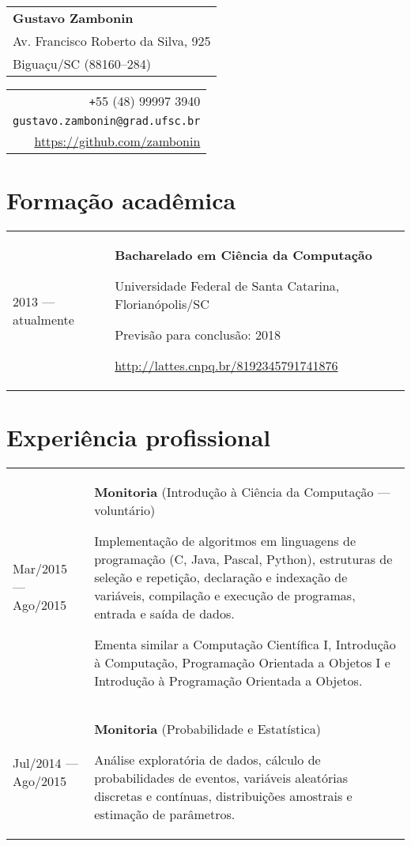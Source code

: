 \documentclass{article}
\newenvironment{contenttable}[1]
  {\section*{#1}
   \newcolumntype{L}{>{\bf \raggedleft}p{0.13\textwidth}}
   \newcolumntype{R}{p{0.82\textwidth}}
   \begin{tabular}{L!{\color{lightgray} \vrule}R}}
  {\end{tabular}}
\newenvironment{smallitem}
  {\vspace{-2mm}\itemize%
   \setlength{\parskip}{0pt}
   \setlength{\itemsep}{2pt}}
  {\vspace{-2mm}\enditemize}
\begin{document}
\begin{tabular}{@{\hspace{-5mm}}l}
  {\Large \textbf{Gustavo Zambonin}}    \\
  Av. Francisco Roberto da Silva, 925   \\
  Biguaçu/SC (88160--284)
\end{tabular}
\hfill
\begin{tabular}{r}
  \verb!+!55 (48) 99997 3940            \\
  \verb!gustavo.zambonin@grad.ufsc.br!  \\
  \url{https://github.com/zambonin}
\end{tabular}

\begin{contenttable}{Formação acadêmica}
  2013 --- atualmente & \textbf{Bacharelado em Ciência da Computação}
  \begin{smallitem}
    \item Universidade Federal de Santa Catarina, Florianópolis/SC
    \item Previsão para conclusão: 2018
    \item \url{http://lattes.cnpq.br/8192345791741876}
  \end{smallitem}
\end{contenttable}

\begin{contenttable}{Experiência profissional}
  Mar/2015 --- Ago/2015 & \textbf{Monitoria}
    (Introdução à Ciência da Computação --- voluntário)
  \begin{smallitem}
    \item Implementação de algoritmos em linguagens de programação (C,
      Java, Pascal, Python), estruturas de seleção e repetição, declaração e
      indexação de variáveis, compilação e execução de programas, entrada e
      saída de dados.
    \item Ementa similar a Computação Científica I, Introdução à
      Computação, Programação Orientada a Objetos I e Introdução à
      Programação Orientada a Objetos.
  \end{smallitem} \\

  Jul/2014 --- Ago/2015 & \textbf{Monitoria} (Probabilidade e Estatística)
  \begin{smallitem}
    \item Análise exploratória de dados, cálculo de probabilidades de
      eventos, variáveis aleatórias discretas e contínuas, distribuições
      amostrais e estimação de parâmetros.
  \end{smallitem}
\end{contenttable}
\end{document}
